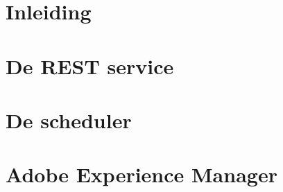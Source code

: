\documentclass[fleqn,a4paper,12pt]{book}
\begin{document}

\inserttitlepage
\usechapterimagefalse


	
	
	

\pagestyle{empty} %
\tableofcontents %
\cleardoublepage %
\pagestyle{fancy} %

	


	\chapter{Inleiding}
	
	
	\chapter{De REST service}
	
	
	
	
	
	
	\chapter{De scheduler}
		
	
	\chapter{Adobe Experience Manager}
	
	
	
	
	
	
	
	
\end{document}
